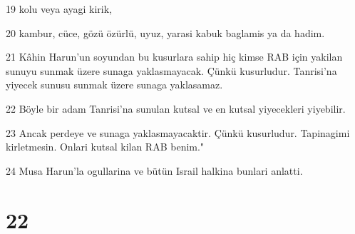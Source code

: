 \par 19 kolu veya ayagi kirik,
\par 20 kambur, cüce, gözü özürlü, uyuz, yarasi kabuk baglamis ya da hadim.
\par 21 Kâhin Harun'un soyundan bu kusurlara sahip hiç kimse RAB için yakilan sunuyu sunmak üzere sunaga yaklasmayacak. Çünkü kusurludur. Tanrisi'na yiyecek sunusu sunmak üzere sunaga yaklasamaz.
\par 22 Böyle bir adam Tanrisi'na sunulan kutsal ve en kutsal yiyecekleri yiyebilir.
\par 23 Ancak perdeye ve sunaga yaklasmayacaktir. Çünkü kusurludur. Tapinagimi kirletmesin. Onlari kutsal kilan RAB benim."
\par 24 Musa Harun'la ogullarina ve bütün Israil halkina bunlari anlatti.

\chapter{22}

